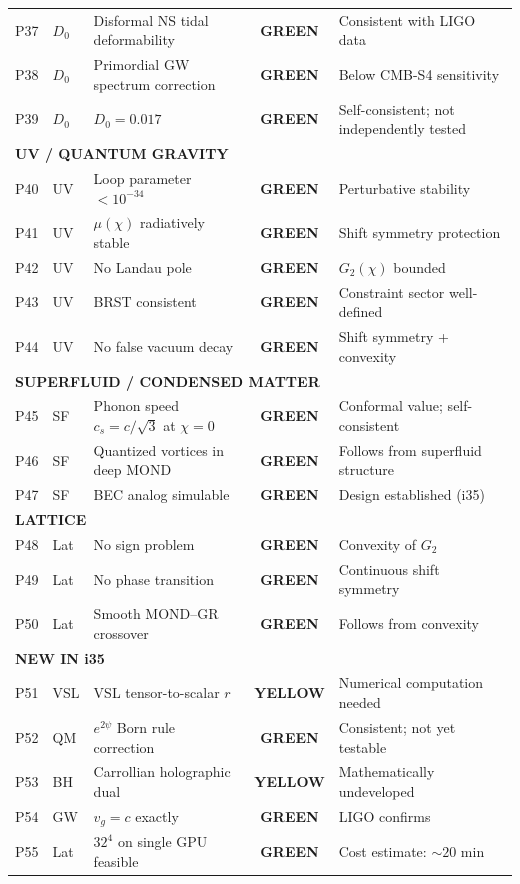 \documentclass[11pt,a4paper]{article}
\newcommand{\GREEN}{\textcolor{dfdgreen}{\textbf{GREEN}}}
\newcommand{\YELLOW}{\textcolor{dfdyellow}{\textbf{YELLOW}}}
\begin{document}
\begin{center}
\begin{longtable}{clp{5.5cm}cl}
P37 & $D_0$ & Disformal NS tidal deformability & \GREEN & Consistent with LIGO data \\
P38 & $D_0$ & Primordial GW spectrum correction & \GREEN & Below CMB-S4 sensitivity \\
P39 & $D_0$ & $D_0 = 0.017$ & \GREEN & Self-consistent; not independently tested \\
\midrule
\multicolumn{5}{l}{\textbf{UV / QUANTUM GRAVITY}} \\
\midrule
P40 & UV & Loop parameter $< 10^{-34}$ & \GREEN & Perturbative stability \\
P41 & UV & $\mu(\chi)$ radiatively stable & \GREEN & Shift symmetry protection \\
P42 & UV & No Landau pole & \GREEN & $G_2(\chi)$ bounded \\
P43 & UV & BRST consistent & \GREEN & Constraint sector well-defined \\
P44 & UV & No false vacuum decay & \GREEN & Shift symmetry + convexity \\
\midrule
\multicolumn{5}{l}{\textbf{SUPERFLUID / CONDENSED MATTER}} \\
\midrule
P45 & SF & Phonon speed $c_s = c/\sqrt{3}$ at $\chi=0$ & \GREEN & Conformal value; self-consistent \\
P46 & SF & Quantized vortices in deep MOND & \GREEN & Follows from superfluid structure \\
P47 & SF & BEC analog simulable & \GREEN & Design established (i35) \\
\midrule
\multicolumn{5}{l}{\textbf{LATTICE}} \\
\midrule
P48 & Lat & No sign problem & \GREEN & Convexity of $G_2$ \\
P49 & Lat & No phase transition & \GREEN & Continuous shift symmetry \\
P50 & Lat & Smooth MOND--GR crossover & \GREEN & Follows from convexity \\
\midrule
\multicolumn{5}{l}{\textbf{NEW IN i35}} \\
\midrule
P51 & VSL & VSL tensor-to-scalar $r$ & \YELLOW & Numerical computation needed \\
P52 & QM & $e^{2\psi}$ Born rule correction & \GREEN & Consistent; not yet testable \\
P53 & BH & Carrollian holographic dual & \YELLOW & Mathematically undeveloped \\
P54 & GW & $v_g = c$ exactly & \GREEN & LIGO confirms \\
P55 & Lat & $32^4$ on single GPU feasible & \GREEN & Cost estimate: $\sim 20$ min \\

\end{longtable}
\end{center}
\end{document}
